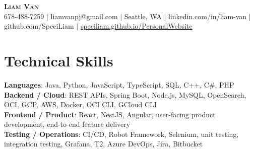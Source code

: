 \documentclass[letterpaper,11pt]{article}
\begin{document}

%
\begin{center}
    \textbf{\Huge \scshape Liam Van} \\ \vspace{1pt}
    \small 678-488-7259 $|$ \small {liamvanpj@gmail.com} $|$ Seattle, WA
 {{$|$ linkedin.com/in/liam-van} {$|$ github.com/SpeciLiam} {$|$ \href{https://speciliam.github.io/PersonalWebsite}{speciliam.github.io/PersonalWebsite}}}

\end{center}

\section{Technical Skills}
 \begin{itemize}[leftmargin=0.15in, label={}]
    \small{\item{
     \textbf{Languages}{: Java, Python, JavaScript, TypeScript, SQL, C++, C\#, PHP} \\
     \textbf{Backend / Cloud}{: REST APIs, Spring Boot, Node.js, MySQL, OpenSearch, OCI, GCP, AWS, Docker, OCI CLI, GCloud CLI} \\
     \textbf{Frontend / Product}{: React, NestJS, Angular, user-facing product development, end-to-end feature delivery} \\
     \textbf{Testing / Operations}{: CI/CD, Robot Framework, Selenium, unit testing, integration testing, Grafana, T2, Azure DevOps, Jira, Bitbucket} \\
    }}
 \end{itemize}
%
\end{document}
